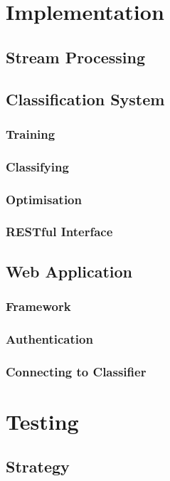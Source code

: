 \documentclass[11pt,a4paper]{report}
\begin{document}
\pagebreak

\chapter{Implementation}
    \section{Stream Processing}
    \section{Classification System}
        \subsection{Training}
        \subsection{Classifying}
        \subsection{Optimisation}
        \subsection{RESTful Interface}
    \section{Web Application}
        \subsection{Framework}
        \subsection{Authentication}
        \subsection{Connecting to Classifier}

\pagebreak

\chapter{Testing}
    \section{Strategy}
\end{document}
